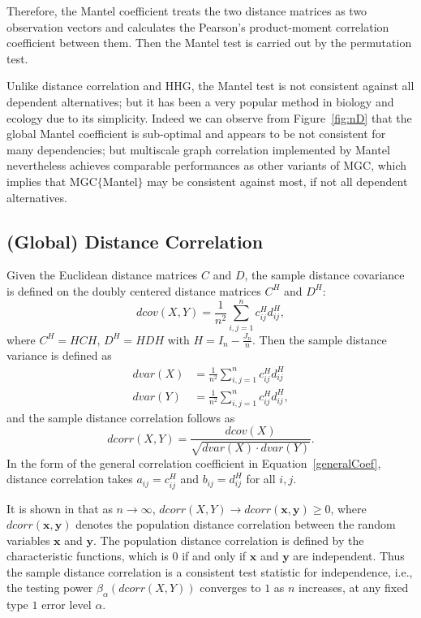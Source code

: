 \documentclass[11pt]{article}
\providecommand{\mb}[1]{\boldsymbol{#1}}
\begin{document}
Therefore, the Mantel coefficient treats the two distance matrices as two observation vectors and calculates the Pearson's product-moment correlation coefficient between them. Then the Mantel test is carried out by the permutation test.

Unlike distance correlation and HHG, the Mantel test is not consistent against all dependent alternatives; but it has been a very popular method in biology and ecology due to its simplicity. Indeed we can observe from Figure~\ref{fig:nD} that the global Mantel coefficient is sub-optimal and appears to be not consistent for many dependencies; but multiscale graph correlation implemented by Mantel nevertheless achieves comparable performances as other variants of MGC, which implies that MGC$\{$Mantel$\}$ may be consistent against most, if not all dependent alternatives.

\subsection{(Global) Distance Correlation}
\label{appen:dcorr}
Given the Euclidean distance matrices $C$ and $D$, the sample distance covariance is defined on the doubly centered distance matrices $C^{H}$ and $D^{H}$:
\begin{equation}
\label{dcovEqu}
dcov(X,Y)=\frac{1}{n^2}\sum_{i,j=1}^{n}c^{H}_{ij}d^{H}_{ij},
\end{equation}
where $C^{H}=HCH$, $D^{H}=HDH$ with $H=I_{n}-\frac{J_{n}}{n}$. Then the sample distance variance is defined as
\begin{align*}
dvar(X) &=\frac{1}{n^2}\sum_{i,j=1}^{n}c^{H}_{ij}d^{H}_{ij}\\
dvar(Y) &=\frac{1}{n^2}\sum_{i,j=1}^{n}c^{H}_{ij}d^{H}_{ij},
\end{align*}
and the sample distance correlation follows as
\begin{equation}
\label{dcorrEqu}
dcorr(X,Y)=\frac{dcov(X)}{\sqrt{dvar(X) \cdot dvar(Y)}}.
\end{equation}
In the form of the general correlation coefficient in Equation~\ref{generalCoef}, distance correlation takes $a_{ij}=c^{H}_{ij}$ and $b_{ij}=d^{H}_{ij}$ for all $i,j$.

It is shown in \cite{SzekelyRizzoBakirov2007} that as $n \rightarrow \infty$, $dcorr(X,Y) \rightarrow dcorr(\mb{x},\mb{y}) \geq 0$, where $dcorr(\mb{x},\mb{y})$ denotes the population distance correlation between the random variables $\mb{x}$ and $\mb{y}$. The population distance correlation is defined by the characteristic functions, which is $0$ if and only if $\mb{x}$ and $\mb{y}$ are independent. Thus the sample distance correlation is a consistent test statistic for independence, i.e., the testing power $\beta_{\alpha}(dcorr(X,Y))$ converges to $1$ as $n$ increases, at any fixed type $1$ error level $\alpha$. 
\end{document}
